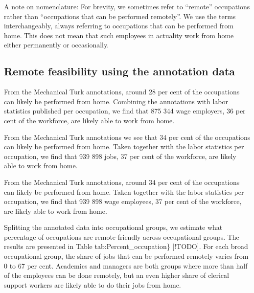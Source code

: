 \documentclass[11pt,]{article}
\begin{document}
A note on nomenclature: For brevity, we sometimes refer to ``remote''
occupations rather than ``occupations that can be performed remotely''.
We use the terms interchangeably, always referring to occupations that
can be performed from home. This does not mean that such employees in
actuality work from home either permanently or occasionally.

\hypertarget{remote-feasibility-using-the-annotation-data}{%
\subsection{Remote feasibility using the annotation
data}\label{remote-feasibility-using-the-annotation-data}}

From the Mechanical Turk annotations, around 28 per cent of the
occupations can likely be performed from home. Combining the annotations
with labor statistics published per occupation, we find that 875 344
wage employers, 36 per cent of the workforce, are likely able to work
from home.

From the Mechanical Turk annotations we see that 34 per cent of the
occupations can likely be performed from home. Taken together with the
labor statistics per occupation, we find that 939 898 jobs, 37 per cent
of the workforce, are likely able to work from home.

From the Mechanical Turk annotations, around 34 per cent of the
occupations can likely be performed from home. Taken together with the
labor statistics per occupation, we find that 939 898 wage employees, 37
per cent of the workforce, are likely able to work from home.

Splitting the annotated data into occupational groups, we estimate what
percentage of occupations are remote-friendly across occupational
groups. The results are presented in Table tab:Percent\_occupation\}
{[}!TODO{]}. For each broad occupational group, the share of jobs that
can be performed remotely varies from 0 to 67 per cent. Academics and
managers are both groups where more than half of the employees can be
done remotely, but an even higher share of clerical support workers are
likely able to do their jobs from home.
\end{document}
